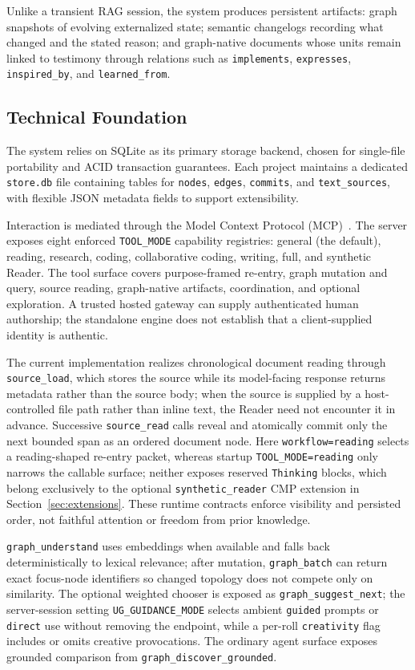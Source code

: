 Unlike a transient RAG session, the system produces persistent artifacts: graph snapshots of evolving externalized state; semantic changelogs recording what changed and the stated reason; and graph-native documents whose units remain linked to testimony through relations such as \texttt{implements}, \texttt{expresses}, \texttt{inspired\_by}, and \texttt{learned\_from}.

\subsection{Technical Foundation}

The system relies on SQLite as its primary storage backend, chosen for single-file portability and ACID transaction guarantees. Each project maintains a dedicated \texttt{store.db} file containing tables for \texttt{nodes}, \texttt{edges}, \texttt{commits}, and \texttt{text\_sources}, with flexible JSON metadata fields to support extensibility.

Interaction is mediated through the Model Context Protocol (MCP)~\cite{anthropic2024mcp}. The server exposes eight enforced \texttt{TOOL\_MODE} capability registries: general (the default), reading, research, coding, collaborative coding, writing, full, and synthetic Reader. The tool surface covers purpose-framed re-entry, graph mutation and query, source reading, graph-native artifacts, coordination, and optional exploration. A trusted hosted gateway can supply authenticated human authorship; the standalone engine does not establish that a client-supplied identity is authentic.

The current implementation realizes chronological document reading through \texttt{source\_load}, which stores the source while its model-facing response returns metadata rather than the source body; when the source is supplied by a host-controlled file path rather than inline text, the Reader need not encounter it in advance. Successive \texttt{source\_read} calls reveal and atomically commit only the next bounded span as an ordered document node. Here \texttt{workflow=reading} selects a reading-shaped re-entry packet, whereas startup \texttt{TOOL\_MODE=reading} only narrows the callable surface; neither exposes reserved \texttt{Thinking} blocks, which belong exclusively to the optional \texttt{synthetic\_reader} CMP extension in Section~\ref{sec:extensions}. These runtime contracts enforce visibility and persisted order, not faithful attention or freedom from prior knowledge.

\texttt{graph\_understand} uses embeddings when available and falls back deterministically to lexical relevance; after mutation, \texttt{graph\_batch} can return exact focus-node identifiers so changed topology does not compete only on similarity. The optional weighted chooser is exposed as \texttt{graph\_suggest\_next}; the server-session setting \texttt{UG\_GUIDANCE\_MODE} selects ambient \texttt{guided} prompts or \texttt{direct} use without removing the endpoint, while a per-roll \texttt{creativity} flag includes or omits creative provocations. The ordinary agent surface exposes grounded comparison from \texttt{graph\_discover\_grounded}.


